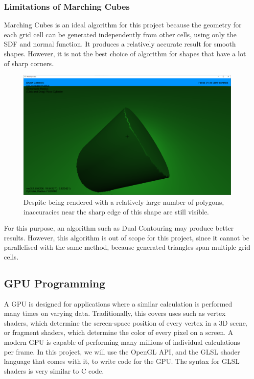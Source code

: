 \documentclass[11pt]{article}
\begin{document}
\subsubsection{Limitations of Marching Cubes}
Marching Cubes is an ideal algorithm for this project because the geometry for each grid cell can be generated independently from other cells, using only the SDF and normal function. It produces a relatively accurate result for smooth shapes. However, it is not the best choice of algorithm for shapes that have a lot of sharp corners.
\begin{figure}[H]
  \includegraphics[width=\textwidth]{mc_cylinder.png}
  \caption{Despite being rendered with a relatively large number of polygons, inaccuracies near the sharp edge of this shape are still visible.}
\end{figure}
For this purpose, an algorithm such as Dual Contouring\cite{10.1145/566654.566586} may produce better results. However, this algorithm is out of scope for this project, since it cannot be parallelised with the same method, because generated triangles span multiple grid cells.

\subsection{GPU Programming}
A GPU is designed for applications where a similar calculation is performed many times on varying data. Traditionally, this covers uses such as vertex shaders, which determine the screen-space position of every vertex in a 3D scene, or fragment shaders, which determine the color of every pixel on a screen. A modern GPU is capable of performing many millions of individual calculations per frame. In this project, we will use the OpenGL API, and the GLSL shader language that comes with it, to write code for the GPU. The syntax for GLSL shaders is very similar to C code. 
\end{document}

